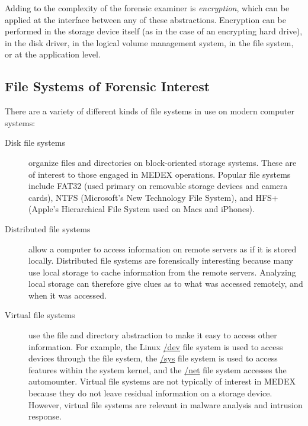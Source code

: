 \documentclass[11pt,letter]{book}
\begin{document}
Adding to the complexity of the forensic examiner is
\emph{encryption}, which can be applied at the interface between any
of these abstractions. Encryption can be performed in the storage
device itself (as in the case of an encrypting hard drive), in the
disk driver, in the logical volume management system, in the file
system, or at the application level.

\subsection{File Systems of Forensic Interest}
There are a variety of different kinds of file systems in use on
modern computer systems:
\begin{description}
\item[Disk file systems] organize files and directories on
  block-oriented storage systems. These are of interest to those
  engaged in MEDEX operations. Popular file systems include FAT32
  (used primary on removable storage devices and camera cards), NTFS
  (Microsoft's New Technology File System), and HFS+ (Apple's
  Hierarchical File System used on Macs and iPhones).
\item[Distributed file systems] allow a computer to access
  information on remote servers as if it is stored
  locally. Distributed file systems are forensically interesting
  because many use local storage to cache information from the remote
  servers. Analyzing local storage can therefore give clues as to what
  was accessed remotely, and when it was accessed.
\item[Virtual file systems] use the file and directory abstraction to
  make it easy to access other information. For example, the Linux
  \url{/dev} file system is used to access devices through the file
  system, the \url{/sys} file system is used to access features within
  the system kernel, and the \url{/net} file system accesses the
  automounter. Virtual file systems are not typically of interest in
  MEDEX because they do not leave residual information on a storage
  device. However, virtual file systems are relevant in malware
  analysis and intrusion response.
\end{description}
\end{document}
